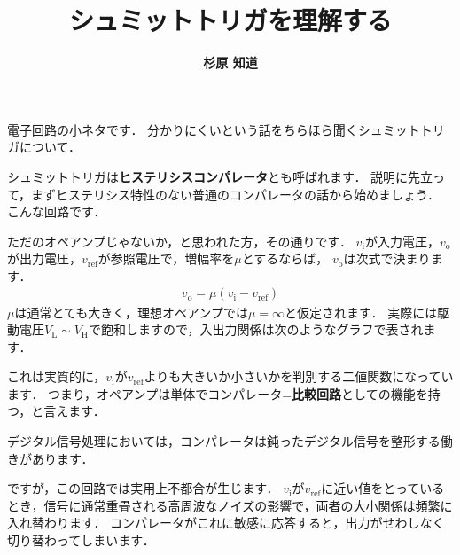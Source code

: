 ﻿\documentclass[a4paper]{jsarticle}
\title{\bf シュミットトリガを理解する}
\author{\Large{\bf 杉原 知道}}
\date{}
\begin{document}
\maketitle
\vspace{-\baselineskip}

電子回路の小ネタです．
分かりにくいという話をちらほら聞くシュミットトリガについて．

シュミットトリガは{\bf ヒステリシスコンパレータ}とも呼ばれます．
説明に先立って，まずヒステリシス特性のない普通のコンパレータの話から始めましょう．
こんな回路です．
\begin{figure}[h]
\begin{center}

\end{center}
\end{figure}

ただのオペアンプじゃないか，と思われた方，その通りです．
$v_{\mathrm{i}}$が入力電圧，$v_{\mathrm{o}}$が出力電圧，$v_{\mathrm{ref}}$が参照電圧で，増幅率を$\mu$とするならば，
$v_{\mathrm{o}}$は次式で決まります．
\begin{align*}
v_{\mathrm{o}}=\mu(v_{\mathrm{i}}-v_{\mathrm{ref}})
\end{align*}
$\mu$は通常とても大きく，理想オペアンプでは$\mu=\infty$と仮定されます．
実際には駆動電圧$V_{\mathrm{L}}\sim V_{\mathrm{H}}$で飽和しますので，入出力関係は次のようなグラフで表されます．
\begin{figure}[h]
\begin{center}

\end{center}
\end{figure}

これは実質的に，$v_{\mathrm{i}}$が$v_{\mathrm{ref}}$よりも大きいか小さいかを判別する二値関数になっています．
つまり，オペアンプは単体でコンパレータ={\bf 比較回路}としての機能を持つ，と言えます．

デジタル信号処理においては，コンパレータは鈍ったデジタル信号を整形する働きがあります．

\begin{figure}[h]
\begin{center}

\end{center}
\end{figure}

ですが，この回路では実用上不都合が生じます．
$v_{\mathrm{i}}$が$v_{\mathrm{ref}}$に近い値をとっているとき，信号に通常重畳される高周波なノイズの影響で，両者の大小関係は頻繁に入れ替わります．
コンパレータがこれに敏感に応答すると，出力がせわしなく切り替わってしまいます．
\end{document}
